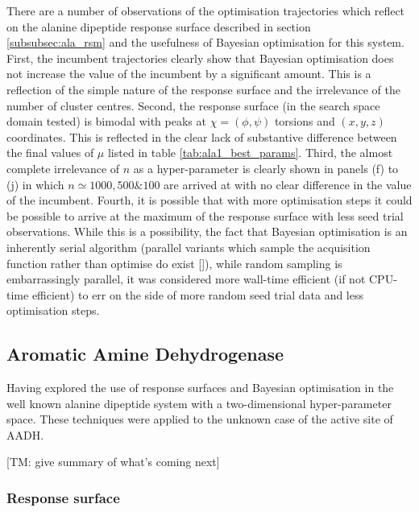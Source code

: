 There are a number of observations of the optimisation trajectories which reflect on the alanine dipeptide response surface described in section \ref{subsubsec:ala_rsm} and the usefulness of Bayesian optimisation for this system. First, the incumbent trajectories clearly show that Bayesian optimisation does not increase the value of the incumbent by a significant amount. This is a reflection of the simple nature of the response surface and the irrelevance of the number of cluster centres. Second, the response surface (in the search space domain tested) is bimodal with peaks at $\chi=(\phi, \psi)$ torsions and $(x, y, z)$ coordinates. This is reflected in the clear lack of substantive difference between the final values of $\mu$ listed in table \ref{tab:ala1_best_params}.  Third, the almost complete irrelevance of $n$ as a hyper-parameter is clearly shown in panels (f) to (j) in which $n \simeq 1000, 500 \& 100$ are arrived at with no clear difference in the value of the incumbent. Fourth, it is possible that with more optimisation steps it could be possible to arrive at the maximum of the response surface with less seed trial observations. While this is a possibility, the fact that Bayesian optimisation is an inherently serial algorithm (parallel variants which sample the acquisition function rather than optimise do exist []), while random sampling is embarrassingly parallel, it was considered more wall-time efficient (if not CPU-time efficient) to err on the side of more random seed trial data and less optimisation steps. 

\subsection{Aromatic Amine Dehydrogenase}\label{subsec:aadh}
Having explored the use of response surfaces and Bayesian optimisation in the well known alanine dipeptide system with a two-dimensional hyper-parameter space. These techniques were applied to the unknown case of the active site of AADH. 

[TM: give summary of what's coming next]

\subsubsection{Response surface}\label{subsubsec:aadh_rsm}

